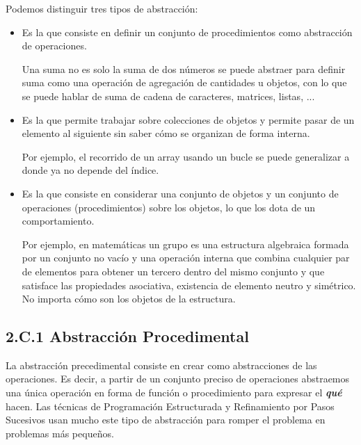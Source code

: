 Podemos distinguir tres tipos de abstracción: 
\begin{itemize}
\item {} Es la que consiste en definir un conjunto de procedimientos como abstracción de operaciones. 

Una suma no es solo la suma de dos números se puede abstraer para definir suma como una operación de agregación de cantidades u objetos, con lo que se puede hablar de suma de cadena de caracteres, matrices, listas, ...

\item {} Es la que permite trabajar sobre colecciones de objetos y permite pasar de un elemento al siguiente sin saber cómo se organizan de forma interna. 

Por ejemplo, el recorrido de un array usando un bucle  se puede generalizar a  donde ya no depende del índice.

\item {} Es la que consiste en considerar una conjunto de objetos y un conjunto de operaciones (procedimientos) sobre los objetos, lo que los dota de un comportamiento. 

Por ejemplo, en matemáticas un grupo es una estructura algebraica formada por un conjunto no vacío y una operación interna que combina cualquier par de elementos para obtener un tercero dentro del mismo conjunto y que satisface las propiedades asociativa, existencia de elemento neutro y simétrico. No importa cómo son los objetos de la estructura.
\end{itemize}



\subsection*{2.C.1 Abstracción Procedimental} 

La abstracción precedimental consiste en crear  como abstracciones de las operaciones. Es decir, a partir de un conjunto preciso de operaciones abstraemos una única operación en forma de función o procedimiento para expresar el \textbf{\textit{qué}} hacen. Las técnicas de Programación Estructurada y Refinamiento por Pasos Sucesivos usan mucho este tipo de abstracción para romper el problema en problemas más pequeños.

